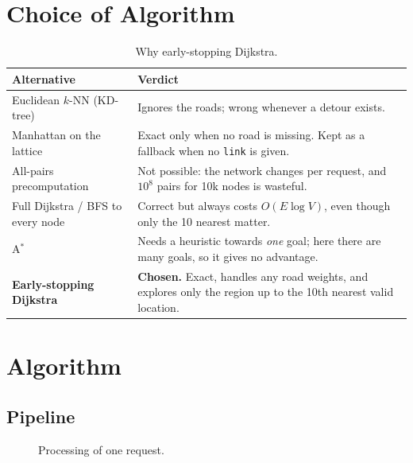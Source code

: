 \documentclass[11pt,a4paper]{article}
\newcommand{\code}[1]{\texttt{#1}}
\begin{document}
\section{Choice of Algorithm}
\begin{table}[h]\centering\small
\begin{tabular}{@{}p{4.2cm}p{10.6cm}@{}}\toprule
\textbf{Alternative} & \textbf{Verdict}\\\midrule
Euclidean $k$-NN (KD-tree) & Ignores the roads; wrong whenever a detour exists.\\
Manhattan on the lattice & Exact only when no road is missing. Kept as a fallback when no \code{link} is given.\\
All-pairs precomputation & Not possible: the network changes per request, and $10^8$ pairs for 10k nodes is wasteful.\\
Full Dijkstra / BFS to every node & Correct but always costs $O(E\log V)$, even though only the 10 nearest matter.\\
A$^*$ & Needs a heuristic towards \emph{one} goal; here there are many goals, so it gives no advantage.\\
\textbf{Early-stopping Dijkstra} & \textbf{Chosen.} Exact, handles any road weights, and explores only the region up to the 10th nearest valid location.\\\bottomrule
\end{tabular}
\caption{Why early-stopping Dijkstra.}
\end{table}

\section{Algorithm}
\subsection{Pipeline}
\begin{figure}[h]\centering
{}
\caption{Processing of one request.}
\end{figure}
\end{document}
